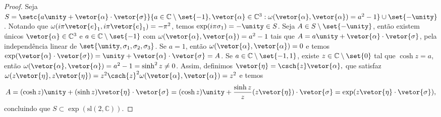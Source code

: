 \begin{proof}
    Seja \(S = \setc{a\unity + \vetor{\alpha}\cdot\vetor{\sigma}}{a \in \mathbb{C}\setminus\set{-1}, \vetor{\alpha} \in \mathbb{C}^3 : \omega(\vetor{\alpha}, \vetor{\alpha})= a^2 - 1}\cup\set{-\unity}\). Notando que \(\omega(i\pi\vetor{e}_1, i\pi \vetor{e}_1) = -\pi^2\), temos \(\exp(i\pi \sigma_1) = -\unity \in S\). Seja \(A \in S \setminus \set{-\unity}\), então existem únicos \(\vetor{\alpha} \in \mathbb{C}^3\) e \(a \in \mathbb{C}\setminus\set{-1}\) com \(\omega(\vetor{\alpha}, \vetor{\alpha}) = a^2 - 1\) tais que \(A = a \unity + \vetor{\alpha}\cdot{\vetor{\sigma}}\), pela independência linear de \(\set{\unity, \sigma_1, \sigma_2, \sigma_3}\).  Se \(a = 1\), então \(\omega(\vetor{\alpha},\vetor{\alpha}) = 0\) e temos \(\exp(\vetor{\alpha}\cdot\vetor{\sigma}) = \unity + \vetor{\alpha}\cdot\vetor{\sigma} = A\). Se \(a \in \mathbb{C} \setminus\set{-1, 1}\), existe \(z\in \mathbb{C}\setminus\set{0}\) tal que \(\cosh{z} = a\), então \(\omega(\vetor{\alpha}, \vetor{\alpha}) = a^2 - 1 = \sinh^2{z} \neq 0\). Assim, definimos \(\vetor{\eta} = \csch{z} \vetor{\alpha},\) que satisfaz \(\omega(z\vetor{\eta},z\vetor{\eta}) = z^2\csch{z}^2 \omega(\vetor{\alpha}, \vetor{\alpha}) = z^2\) e temos
    \begin{equation*}
        A = (\cosh{z})\unity + (\sinh{z}) \vetor{\eta}\cdot \vetor{\sigma} = (\cosh{z})\unity + \frac{\sinh{z}}{z}(z\vetor{\eta})\cdot \vetor{\sigma} = \exp(z \vetor{\eta}\cdot \vetor{\sigma}),
    \end{equation*}
    concluindo que \(S \subset \exp(\mathrm{sl}(2,\mathbb{C}))\).


\end{proof}
